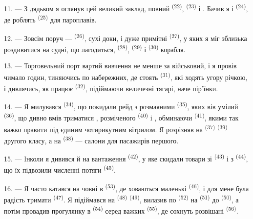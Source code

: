 \VUsaut{3.0mm}
\VUsaut{3.0mm}

11. --- З дядьком я оглянув цей великий заклад, повний 
\textsuperscript{(22)},  \textsuperscript{(23)} і
. Бачив я і  \textsuperscript{(24)}, де роблять
 \textsuperscript{(25)} для пароплавів.

12. --- Зовсім поруч ---  \textsuperscript{(26)}, сухі доки, і дуже
примітні  \textsuperscript{(27)}, у яких я міг зблизька
роздивитися на судні, що лагодиться,  \textsuperscript{(28)},
 \textsuperscript{(29)} і  \textsuperscript{(30)}
корабля.

13. --- Торговельний порт вартий вивчення не менше за військовий, і я провів
чимало годин, тиняючись по набережних, де стоять 
\textsuperscript{(31)}, які ходять угору річкою, і дивлячись, як працює
 \textsuperscript{(32)}, підіймаючи величезні тягарі, наче
пір'їнки.

\VUsaut{4.0mm}
\VUsaut{3.0mm}

14. --- Я милувався 
\textsuperscript{(34)}, що покидали рейд з розмаяними 
\textsuperscript{(35)}, яких вів умілий  \textsuperscript{(36)}, що
дивно вмів триматися , розміченого 
\textsuperscript{(40)} і , обминаючи 
\textsuperscript{(41)}, якими так важко правити під єдиним чотирикутним
вітрилом. Я розрізняв на  \textsuperscript{(37)} 
\textsuperscript{(39)} другого класу, а на  \textsuperscript{(38)}
--- салони для пасажирів першого.

15. --- Інколи я дивився й на вантаження 
\textsuperscript{(42)}, у яке скидали товари зі 
\textsuperscript{(43)} і з  \textsuperscript{(44)}, що
їх підвозили численні потяги  \textsuperscript{(45)}.

\VUsaut{3.0mm}
\VUsaut{3.0mm}

16. --- Я часто катався на човні в 
\textsuperscript{(53)}, де ховаються маленькі 
\textsuperscript{(46)}, і для мене була радість тримати 
\textsuperscript{(47)}. Я підіймався на  \textsuperscript{(48)}
 \textsuperscript{(49)}, вилазив по 
\textsuperscript{(52)} на  \textsuperscript{(51)} до 
\textsuperscript{(50)}, а потім провадив прогулянку в 
\textsuperscript{(54)} серед важких 
\textsuperscript{(55)}, де сохнуть розвішані  \textsuperscript{(56)}.

